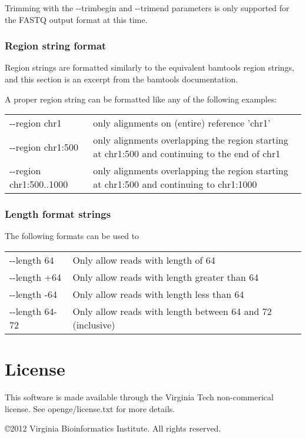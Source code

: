 \documentclass[11pt]{article}
\begin{document}
Trimming with the {-}{-}trimbegin and {-}{-}trimend parameters is only supported for the FASTQ output format at this time.

\subsubsection{Region string format}
Region strings are formatted similarly to the equivalent bamtools region strings, and this section is an excerpt from the bamtools documentation.

A proper region string can be formatted like any of the following examples:

\begin{center}
\begin{tabular}{lp{3.5in}}
{-}{-}region chr1&only alignments on (entire) reference 'chr1'\\
{-}{-}region chr1:500&only alignments overlapping the region starting at chr1:500 and continuing to the end of chr1\\
{-}{-}region chr1:500..1000&only alignments overlapping the region starting at chr1:500 and continuing to chr1:1000\\
\end{tabular}
\end{center}

\subsubsection{Length format strings}
The following formats can be used to 
\begin{center}
\begin{tabular}{lp{3.5in}}
{-}{-}length 64&Only allow reads with length of 64\\
{-}{-}length +64&Only allow reads with length greater than 64\\
{-}{-}length -64&Only allow reads with length less than 64\\
{-}{-}length 64-72&Only allow reads with length between 64 and 72 (inclusive)\\
\end{tabular}
\end{center}

\section {License}
This software is made available through the Virginia Tech non-commerical license. See openge/license.txt for more details. 

\copyright 2012 Virginia Bioinformatics Institute. All rights reserved.
\end{document}
